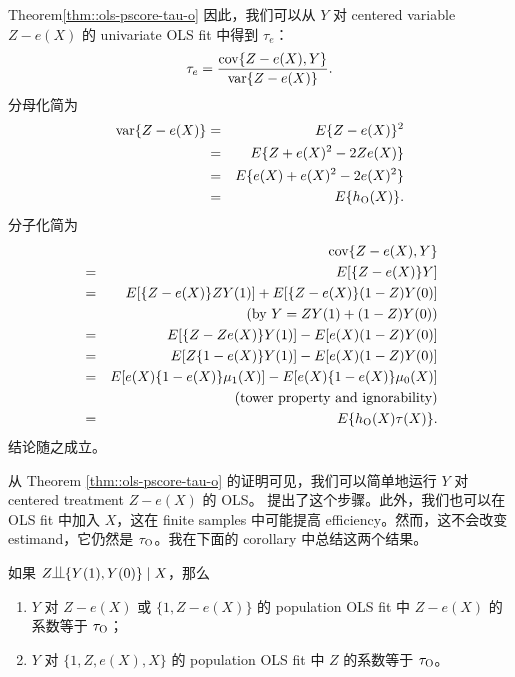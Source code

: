 \begin{myproof}{Theorem}{\ref{thm::ols-pscore-tau-o}}
因此，我们可以从 $Y$ 对 centered variable $Z - e(X)$ 的 univariate OLS fit 中得到 $\tau_e$：
$$
\tau_e = 
\frac{ \textup{cov}\{  Z-e(X) , Y \}  }{  \textup{var}\{ Z - e(X) \} } .
$$
分母化简为
\begin{eqnarray*}
\textup{var}\{ Z - e(X) \} &=& E\{ Z - e(X)\}^2 \\
&=& E\{ Z + e(X)^2 - 2Ze(X)\} \\
&=&E\{ e(X) + e(X)^2 - 2e(X)^2 \} \\
&=&E\{ h_\textsc{O}(X) \} .
\end{eqnarray*}
分子化简为
\begin{eqnarray*}
&&\textup{cov}\{ Z-e(X)  , Y\} \\
&=&  E[ \{ Z-e(X)  \} Y ] \\
&=& E[ \{ Z-e(X)  \} ZY(1) ] + E[ \{ Z-e(X)  \} (1-Z)Y(0) ] \\
&& \quad\quad\quad\quad (\text{by } Y = ZY(1)  + (1-Z)Y(0)) \\
&=& E[ \{ Z- Ze(X)  \} Y(1)]  - E[  e(X)  (1-Z)Y(0) ]  \\
&=&  E[  Z\{ 1- e(X)  \} Y(1) ] - E [ e(X)  (1-Z)Y(0) ] \\
&=& E[  e(X)\{ 1- e(X)  \} \mu_1(X)]  - E[  e(X)  \{ 1- e(X)  \}  \mu_0(X) ]\\
&&   \quad\quad\quad\quad (\text{tower property and ignorability}) \\
&=& E\{ h_\textsc{O}(X) \tau(X) \} .
\end{eqnarray*}
结论随之成立。
 \end{myproof}
 
 
 从 Theorem \ref{thm::ols-pscore-tau-o} 的证明可见，我们可以简单地运行 $Y$ 对 centered treatment $ Z-e(X)$ 的 OLS。\citet{lee2018simple} 提出了这个步骤。此外，我们也可以在 OLS fit 中加入 $X$，这在 finite samples 中可能提高 efficiency。然而，这不会改变 estimand，它仍然是 $\tau_\textsc{O}$。我在下面的 corollary 中总结这两个结果。
 
 \begin{corollary}\label{coro::regress-on-pscore}
如果 $Z\ind \{  Y(1), Y(0) \} \mid X$，那么
 \begin{enumerate}
 \item[(1)]
 $Y$ 对 $Z-e(X)$ 或 $\{1, Z-e(X) \}$ 的 population OLS fit 中 $Z-e(X)$ 的系数等于 $\tau_\textsc{O}$；
 \item[(2)]
 $Y$ 对 $\{1, Z, e(X), X\}$ 的 population OLS fit 中 $Z$ 的系数等于 $\tau_\textsc{O}$。
 \end{enumerate}
 \end{corollary}
 
